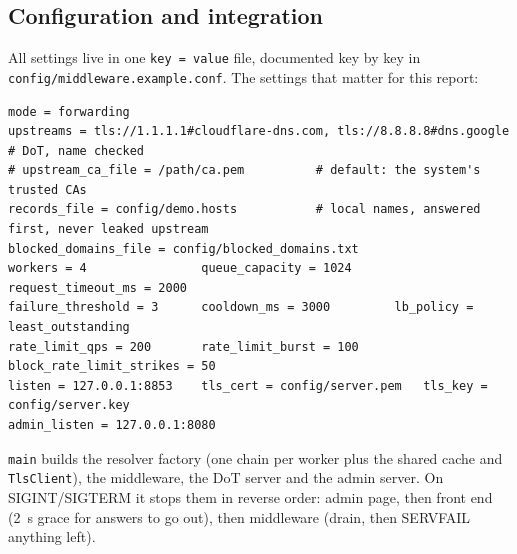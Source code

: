 \documentclass[11pt,a4paper]{article}
\newcommand{\code}[1]{\texttt{#1}}
\begin{document}
\subsection{Configuration and integration}
All settings live in one \code{key = value} file, documented key by key in
\code{config/\allowbreak middleware.example.conf}. The settings that matter for this report:
\begin{lstlisting}
mode = forwarding
upstreams = tls://1.1.1.1#cloudflare-dns.com, tls://8.8.8.8#dns.google   # DoT, name checked
# upstream_ca_file = /path/ca.pem          # default: the system's trusted CAs
records_file = config/demo.hosts           # local names, answered first, never leaked upstream
blocked_domains_file = config/blocked_domains.txt
workers = 4                queue_capacity = 1024      request_timeout_ms = 2000
failure_threshold = 3      cooldown_ms = 3000         lb_policy = least_outstanding
rate_limit_qps = 200       rate_limit_burst = 100     block_rate_limit_strikes = 50
listen = 127.0.0.1:8853    tls_cert = config/server.pem   tls_key = config/server.key
admin_listen = 127.0.0.1:8080
\end{lstlisting}
\code{main} builds the resolver factory (one chain per worker plus the shared cache and \code{TlsClient}), the
middleware, the DoT server and the admin server. On SIGINT/SIGTERM it stops them in reverse order: admin page,
then front end (2~s grace for answers to go out), then middleware (drain, then SERVFAIL anything left).
\end{document}
